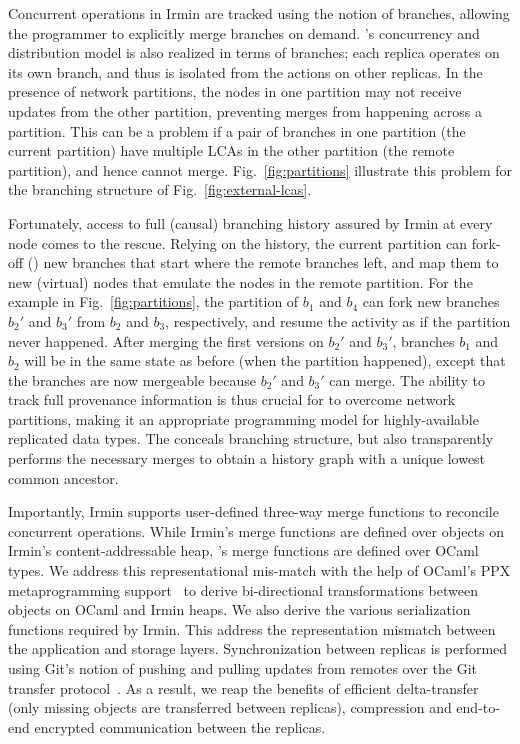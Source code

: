 Concurrent operations in Irmin are tracked using the notion of
branches, allowing the programmer to explicitly merge branches on
demand. \name's concurrency and distribution model is also realized in
terms of branches; each replica operates on its own branch, and thus
is isolated from the actions on other replicas. In the presence of
network partitions, the nodes in one partition may not receive updates
from the other partition, preventing merges from happening across a
partition. This can be a problem if a pair of branches in one
partition (the current partition) have multiple LCAs in the other
partition (the remote partition), and hence cannot
merge. Fig.~\ref{fig:partitions} illustrate this problem for the
branching structure of Fig.~\ref{fig:external-lcas}.

Fortunately, access to full (causal) branching history assured by
Irmin at every node comes to the rescue. Relying on the history, the
current partition can fork-off () new branches that start
where the remote branches left, and map them to new (virtual) nodes
that emulate the nodes in the remote partition. For the example in
Fig.~\ref{fig:partitions}, the partition of $b_1$ and $b_4$ can fork
new branches $b_2'$ and $b_3'$ from $b_2$ and $b_3$, respectively, and
resume the activity as if the partition never happened. After merging
the first versions on $b_2'$ and $b_3'$, branches $b_1$ and $b_2$ will
be in the same state as before (when the partition happened), except
that the branches are now mergeable because $b_2'$ and $b_3'$ can
merge. The ability to track full provenance information is thus
crucial for \name to overcome network partitions, making it an
appropriate programming model for highly-available replicated data
types. The \nameMonad conceals branching structure, but also
transparently performs the necessary merges to obtain a history graph
with a unique lowest common ancestor.

Importantly, Irmin supports user-defined three-way merge functions to
reconcile concurrent operations.  While Irmin's merge functions are defined
over objects on Irmin's content-addressable heap, \name's merge functions are
defined over OCaml types. We address this representational mis-match with the
help of OCaml's PPX metaprogramming support~\cite{ppx} to derive bi-directional
transformations between objects on OCaml and Irmin heaps. We also derive the
various serialization functions required by Irmin. This address the representation
mismatch between the application and storage layers. Synchronization between
replicas is performed using Git's notion of pushing and pulling updates from
remotes over the Git transfer protocol~\cite{git-tp}. As a result, we reap the
benefits of efficient delta-transfer (only missing objects are transferred
between replicas), compression and end-to-end encrypted communication between
the replicas.
